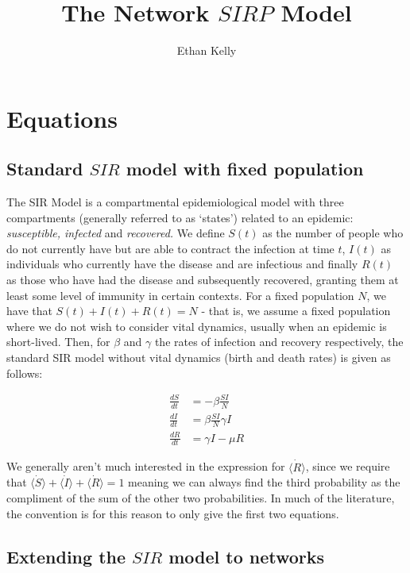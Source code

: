 \documentclass[12pt,a4paper]{article}
\author{Ethan Kelly}
\title{The Network $SIRP$ Model}
\begin{document}
\maketitle

\section{Equations}

\subsection{Standard $SIR$ model with fixed population}

The SIR Model is a compartmental epidemiological model with three compartments (generally referred to as `states') related to an epidemic: {\it susceptible, infected} and {\it recovered.} We define $S(t)$ as the number of people who do not currently have but are able to contract the infection at time $t$, $I(t)$ as individuals who currently have the disease and are infectious and finally $R(t)$ as those who have had the disease and subsequently recovered, granting them at least some level of immunity in certain contexts. For a fixed population $N$, we have that $S(t) + I(t) + R(t) = N$ - that is, we assume a fixed population where we do not wish to consider vital dynamics, usually when an epidemic is short-lived. Then, for $\beta$ and $\gamma$ the rates of infection and recovery respectively, the standard SIR model without vital dynamics (birth and death rates) is given as follows:

\begin{align}
\frac{dS}{dt} & = -\beta \frac{SI}{N} \label{dS}\\
\frac{dI}{dt} & = \beta\frac{SI}{N} \gamma I \label{dI}\\
\frac{dR}{dt} & = \gamma I - \mu R \label{dR}
\end{align}

We generally aren't much interested in the expression for $\dot{\langle R \rangle}$, since we require that $ \dot{\langle S \rangle} + \dot{\langle I \rangle} + \dot{\langle R \rangle} = 1$ meaning we can always find the third probability as the compliment of the sum of the other two probabilities. In much of the literature, the convention is for this reason to only give the first two equations.

\subsection{Extending the $SIR$ model to networks}
\end{document}
